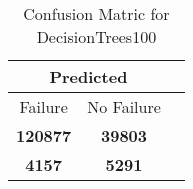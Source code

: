 \begin{table}[] 
\caption{Confusion Matric for DecisionTrees100} 
\label{Table: Prediction Accuracy-NoneDecisionTrees100RandomForest100EKF-ignoreReflection100.9EKF-top2-Reflection} 
\centering 
\begin{tabular} 
 {@{}ccc@{}} 
\toprule 
\multicolumn{2}{c}{\textbf{Predicted}}
 \\ \midrule 
\multicolumn{1}{|c|}{Failure} & 
\multicolumn{1}{c|}{No Failure}
 \\ \midrule 
\multicolumn{1}{|c|}{\color{green}\textbf{120877}} & 
\multicolumn{1}{c|}{\color{green}\textbf{39803}}
 \\ \midrule 
\multicolumn{1}{|c|}{\color{red}\textbf{4157}} & 
\multicolumn{1}{c|}{\color{red}\textbf{5291}}
 \\ \bottomrule 
\end{tabular} 
\end{table} 
